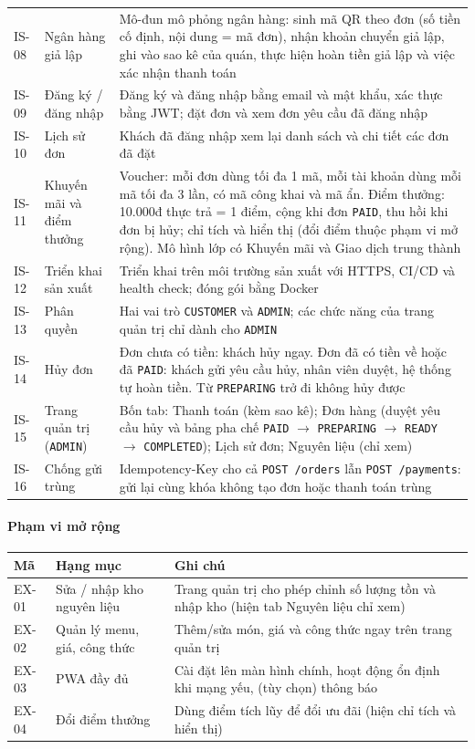 {\begin{tabularx}{\linewidth}{@{}l l X@{}}
IS-08 & Ngân hàng giả lập & Mô-đun mô phỏng ngân hàng: sinh mã QR theo đơn (số tiền cố định, nội dung = mã đơn), nhận khoản chuyển giả lập, ghi vào sao kê của quán, thực hiện hoàn tiền giả lập và việc xác nhận thanh toán \\
IS-09 & Đăng ký / đăng nhập & Đăng ký và đăng nhập bằng email và mật khẩu, xác thực bằng JWT; đặt đơn và xem đơn yêu cầu đã đăng nhập \\
IS-10 & Lịch sử đơn & Khách đã đăng nhập xem lại danh sách và chi tiết các đơn đã đặt \\
IS-11 & Khuyến mãi và điểm thưởng & Voucher: mỗi đơn dùng tối đa 1 mã, mỗi tài khoản dùng mỗi mã tối đa 3 lần, có mã công khai và mã ẩn. Điểm thưởng: 10.000đ thực trả = 1 điểm, cộng khi đơn \texttt{PAID}, thu hồi khi đơn bị hủy; chỉ tích và hiển thị (đổi điểm thuộc phạm vi mở rộng). Mô hình lớp có Khuyến mãi và Giao dịch trung thành  \\
IS-12 & Triển khai sản xuất & Triển khai trên môi trường sản xuất với HTTPS, CI/CD và health check; đóng gói bằng Docker \\
IS-13 & Phân quyền & Hai vai trò \texttt{CUSTOMER} và \texttt{ADMIN}; các chức năng của trang quản trị chỉ dành cho \texttt{ADMIN} \\[4pt]
IS-14 & Hủy đơn & Đơn chưa có tiền: khách hủy ngay. Đơn đã có tiền về hoặc đã \texttt{PAID}: khách gửi yêu cầu hủy, nhân viên duyệt, hệ thống tự hoàn tiền. Từ \texttt{PREPARING} trở đi không hủy được \\[4pt]
IS-15 & Trang quản trị (\texttt{ADMIN}) & Bốn tab: Thanh toán (kèm sao kê); Đơn hàng (duyệt yêu cầu hủy và bảng pha chế \texttt{PAID} $\rightarrow$ \texttt{PREPARING} $\rightarrow$ \texttt{READY} $\rightarrow$ \texttt{COMPLETED}); Lịch sử đơn; Nguyên liệu (chỉ xem) \\[4pt]
IS-16 & Chống gửi trùng & Idempotency-Key cho cả \texttt{POST /orders} lẫn \texttt{POST /payments}: gửi lại cùng khóa không tạo đơn hoặc thanh toán trùng \\[4pt]
\bottomrule
\end{tabularx}}

\paragraph{Phạm vi mở rộng}

{\small\renewcommand{\arraystretch}{1.25}
\begin{tabularx}{\linewidth}{@{}l l X@{}}
\toprule
\textbf{Mã} & \textbf{Hạng mục} & \textbf{Ghi chú} \\
\midrule
EX-01 & Sửa / nhập kho nguyên liệu & Trang quản trị cho phép chỉnh số lượng tồn và nhập kho (hiện tab Nguyên liệu chỉ xem) \\
EX-02 & Quản lý menu, giá, công thức & Thêm/sửa món, giá và công thức ngay trên trang quản trị \\
EX-03 & PWA đầy đủ & Cài đặt lên màn hình chính, hoạt động ổn định khi mạng yếu, (tùy chọn) thông báo \\
EX-04 & Đổi điểm thưởng & Dùng điểm tích lũy để đổi ưu đãi (hiện chỉ tích và hiển thị) \\
\bottomrule
\end{tabularx}}

